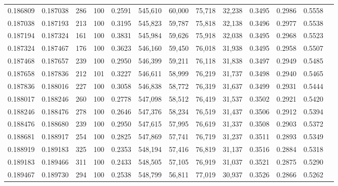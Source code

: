 \begin{tabular}{rrrrrrrrrrrrr}
0.186809 & 0.187038 &   286 & 100 &                                     0.2591 & 545,610 &  60,000 &  75,718 &  32,238 & 0.3495 & 0.2986 & 0.5558 \\
0.187038 & 0.187193 &   213 & 100 &                                     0.3195 & 545,823 &  59,787 &  75,818 &  32,138 & 0.3496 & 0.2977 & 0.5538 \\
0.187194 & 0.187324 &   161 & 100 &                                     0.3831 & 545,984 &  59,626 &  75,918 &  32,038 & 0.3495 & 0.2968 & 0.5523 \\
0.187324 & 0.187467 &   176 & 100 &                                     0.3623 & 546,160 &  59,450 &  76,018 &  31,938 & 0.3495 & 0.2958 & 0.5507 \\
0.187468 & 0.187657 &   239 & 100 &                                     0.2950 & 546,399 &  59,211 &  76,118 &  31,838 & 0.3497 & 0.2949 & 0.5485 \\
0.187658 & 0.187836 &   212 & 101 &                                     0.3227 & 546,611 &  58,999 &  76,219 &  31,737 & 0.3498 & 0.2940 & 0.5465 \\
0.187836 & 0.188016 &   227 & 100 &                                     0.3058 & 546,838 &  58,772 &  76,319 &  31,637 & 0.3499 & 0.2931 & 0.5444 \\
0.188017 & 0.188246 &   260 & 100 &                                     0.2778 & 547,098 &  58,512 &  76,419 &  31,537 & 0.3502 & 0.2921 & 0.5420 \\
0.188246 & 0.188476 &   278 & 100 &                                     0.2646 & 547,376 &  58,234 &  76,519 &  31,437 & 0.3506 & 0.2912 & 0.5394 \\
0.188476 & 0.188680 &   239 & 100 &                                     0.2950 & 547,615 &  57,995 &  76,619 &  31,337 & 0.3508 & 0.2903 & 0.5372 \\
0.188681 & 0.188917 &   254 & 100 &                                     0.2825 & 547,869 &  57,741 &  76,719 &  31,237 & 0.3511 & 0.2893 & 0.5349 \\
0.188919 & 0.189183 &   325 & 100 &                                     0.2353 & 548,194 &  57,416 &  76,819 &  31,137 & 0.3516 & 0.2884 & 0.5318 \\
0.189183 & 0.189466 &   311 & 100 &                                     0.2433 & 548,505 &  57,105 &  76,919 &  31,037 & 0.3521 & 0.2875 & 0.5290 \\
0.189467 & 0.189730 &   294 & 100 &                                     0.2538 & 548,799 &  56,811 &  77,019 &  30,937 & 0.3526 & 0.2866 & 0.5262 \\

\end{tabular}
